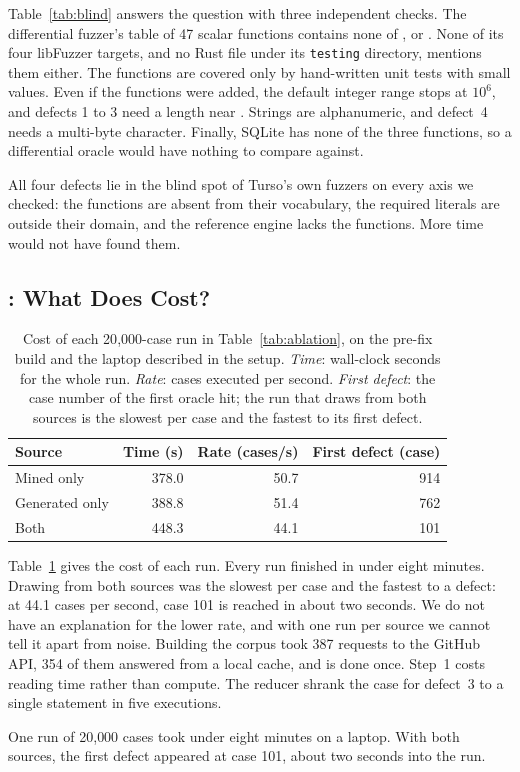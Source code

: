 Table~\ref{tab:blind} answers the question with three independent checks. The
differential fuzzer's table of 47 scalar functions contains none of
,  or . None of its four libFuzzer targets, and
no Rust file under its \texttt{testing} directory, mentions them either. The
functions are covered only by hand-written unit tests with small values. Even if
the functions were added, the default integer range stops at $10^6$, and defects
1 to 3 need a length near \imax. Strings are alphanumeric, and defect~4 needs a
multi-byte character. Finally, SQLite has none of the three functions, so a
differential oracle would have nothing to compare against.

\begin{observation}
\label{obs:blind}
All four defects lie in the blind spot of Turso's own fuzzers on every axis we
checked: the functions are absent from their vocabulary, the required literals
are outside their domain, and the reference engine lacks the functions. More time
would not have found them.
\end{observation}

\subsection{: What Does \tool Cost?}
\label{sec:rq4}

\begin{table}[t]
  \caption{Cost of each 20{,}000-case run in Table~\ref{tab:ablation}, on the
  pre-fix build and the laptop described in the setup.
  \emph{Time}: wall-clock seconds for the whole run. \emph{Rate}: cases executed
  per second. \emph{First defect}: the case number of the first oracle hit; the run that draws
  from both sources is the slowest per case and the fastest to its first defect.}
  \label{tab:cost}
  \footnotesize
  \begin{tabular}{@{}lrrr@{}}
    \toprule
    Source & Time (s) & Rate (cases/s) & First defect (case) \\
    \midrule
    Mined only     & 378.0 & 50.7 & 914 \\
    Generated only & 388.8 & 51.4 & 762 \\
    Both           & 448.3 & 44.1 & 101 \\
    \bottomrule
  \end{tabular}
\end{table}

Table~\ref{tab:cost} gives the cost of each run. Every run finished in under eight
minutes. Drawing from both sources was the slowest per case and the fastest to a
defect: at 44.1 cases per second, case 101 is reached in about two seconds. We do
not have an explanation for the lower rate, and with one run per source we cannot
tell it apart from noise. Building the corpus took 387 requests to the GitHub API,
354 of them answered from a local cache, and is done once. Step~1 costs reading
time rather than compute. The reducer shrank the case for defect~3 to a single
statement in five executions.

\begin{observation}
\label{obs:cost}
One run of 20{,}000 cases took under eight minutes on a laptop. With both sources,
the first defect appeared at case 101, about two seconds into the run.
\end{observation}
